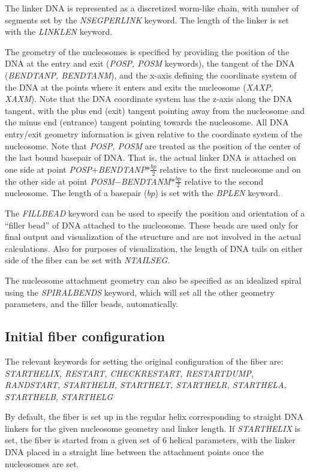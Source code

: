 \documentclass[12pt,dvips]{article}
\begin{document}
The linker DNA is represented as a discretized worm-like chain, with
number of segments set by the {\em NSEGPERLINK} keyword. 
The length of the linker is set with the {\em LINKLEN} keyword. 

The geometry of the nucleosomes is specified by providing the
position of the DNA at the entry and exit ({\em POSP, POSM}
keywords), the tangent of the DNA ({\em BENDTANP, BENDTANM}), and the
x-axis defining the coordinate system of the DNA at the points where
it enters and exits the nucleosome ({\em XAXP, XAXM}). Note that the
DNA coordinate system has the z-axis along the DNA tangent, with the
plus end (exit) tangent pointing away from the nucleosome and the
minus end (entrance) tangent pointing towards the nucleosome. All DNA
entry/exit geometry information is given relative to the coordinate
system of the nucleosome. Note that {\em POSP, POSM} are treated as
the position of the center of the last bound basepair of DNA. That is,
the actual linker DNA is attached on one side at point
{\em POSP}$+${\em BENDTANP}$*\frac{bp}{2}$ relative to the first nucleosome and
on the other side at point {\em POSM}$-${\em BENDTANM}$*\frac{bp}{2}$ relative to
the second nucleosome. The length of a basepair ($bp$) is set with the
{\em BPLEN} keyword.

The {\em FILLBEAD} keyword can be used to specify the position and
orientation of a ``filler bead'' of DNA attached to the
nucleosome. These beads are used only for final output and
visualization of the structure and are not involved in the actual
calculations. Also for purposes of visualization, the length of DNA
tails on either side of the fiber can be set with {\em NTAILSEG}.

The nucleosome attachment geometry can also be specified as an
idealized spiral using the {\em SPIRALBENDS} keyword, which will set
all the other geometry parameters, and the filler beads, automatically.

\subsection{Initial fiber configuration}
\label{sec:startstruct}
The relevant keywords for setting the original configuration of the
fiber are: {\em STARTHELIX, RESTART, CHECKRESTART, RESTARTDUMP,
  RANDSTART, STARTHELH, STARTHELT, STARTHELR, STARTHELA, STARTHELB, STARTHELG}

By default, the fiber is set up in the regular helix corresponding to
straight DNA linkers for the given nucleosome geometry and linker length.
If {\em STARTHELIX} is set, the fiber is started from a given set
of 6 helical parameters, with the linker DNA placed in a straight line
between the attachment points once the nucleosomes are set. 
\end{document}
